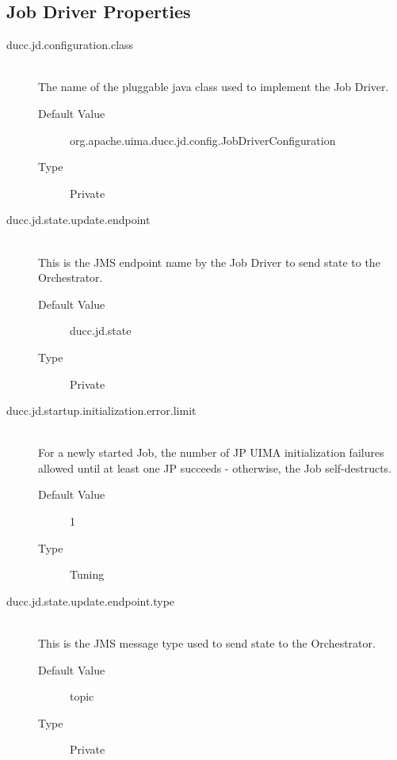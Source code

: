 \subsection{Job Driver Properties}
    \begin{description}
        \item[ducc.jd.configuration.class] \hfill \\
          The name of the pluggable java class used to implement the Job Driver. 
          \begin{description}
            \item[Default Value] org.apache.uima.ducc.jd.config.JobDriverConfiguration 
            \item[Type] Private 
          \end{description}
          
        \item[ducc.jd.state.update.endpoint] \hfill \\
          This is the JMS endpoint name by the Job Driver to send state to the Orchestrator. 
          \begin{description}
            \item[Default Value] ducc.jd.state               
            \item[Type] Private 
          \end{description}
            
        \item[ducc.jd.startup.initialization.error.limit] \hfill \\
          For a newly started Job, the number of JP UIMA initialization failures
          allowed until at least one JP succeeds - otherwise, the Job self-destructs.
          \begin{description}
            \item[Default Value] 1     
            \item[Type] Tuning
          \end{description}
            

        \item[ducc.jd.state.update.endpoint.type] \hfill \\
          This is the JMS message type used to send state to the Orchestrator. 
          \begin{description}            
            \item[Default Value] topic 
            \item[Type] Private 
          \end{description}
          


\end{description}

